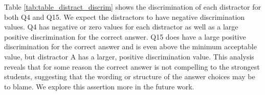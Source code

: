 

\FloatBarrier
 
 Table \ref{tab:table_distract_discrim} shows the discrimination of each distractor for both Q4 and Q15. We expect the distractors to have negative discrimination values. Q4 has negative or zero values for each distractor as well as a large positive discrimination for the correct answer. Q15 does have a large positive discrimination for the correct answer and is even above the minimum acceptable value, but distractor A has a larger, positive discrimination value. This analysis reveals that for some reason the correct answer is not compelling to the strongest students, suggesting that the wording or structure of the answer choices may be to blame. We explore this assertion more in the future work.


